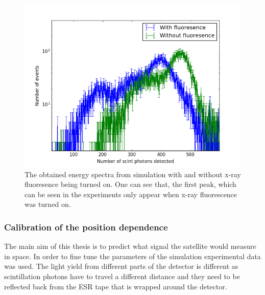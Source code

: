 \documentclass[12pt, a4paper,titlepage]{article}
\numberwithin{equation}{section}
\numberwithin{figure}{section}
\begin{document}
\begin{figure}[h!]
\centering
\includegraphics[width=140.0mm]{images/fluovsnofluo.png}
\caption{The obtained energy spectra from simulation with and without x-ray fluoresence being turned on. One can see that, the first peak, which can be seen in the experiments only appear when x-ray fluorescence was turned on.}
\label{fig:fluo}
\end{figure}

\pagebreak

\subsubsection{Calibration of the position dependence}

The main aim of this thesis is to predict what signal the satellite would measure in space. In order to fine tune the parameters of the simulation experimental data was used. The light yield from different parts of the detector is different as scintillation photons have to travel a different distance and they need to be reflected back from the ESR tape that is wrapped around the detector.
\end{document}
